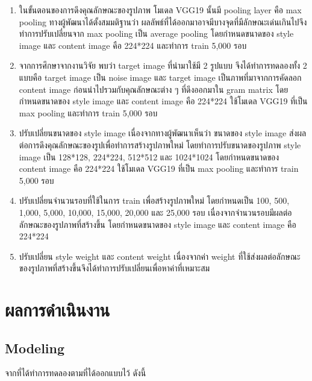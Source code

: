 \documentclass[12pt,oneside,openright,a4paper]{cpe-thai-project}
\begin{document}
\begin{enumerate}
  \item ในขั้นตอนของการดึงคุณลักษณะของรูปภาพ โมเดล VGG19 นั้นมี pooling layer คือ max pooling ทางผู้พัฒนาได้ตั้งสมมติฐานว่า ผลลัพธ์ที่ได้ออกมาอาจมีบางจุดที่มีลักษณะเด่นเกินไปจึงทำการปรับเปลี่ยนจาก max pooling เป็น average pooling โดยกำหนดขนาดของ style image และ content image คือ 224*224 และทำการ train 5,000 รอบ
  \item จากการศึกษาจากงานวิจัย พบว่า target image ที่นำมาใช้มี 2 รูปแบบ จึงได้ทำการทดลองทั้ง 2 แบบคือ target image เป็น noise image และ target image เป็นภาพที่มาจากการคัดลอก content image ก่อนนำไปรวมกับคุณลักษณะต่าง ๆ ที่ดึงออกมาใน gram matrix โดยกำหนดขนาดของ style image และ content image คือ 224*224 ใช้โมเดล VGG19 ที่เป็น max pooling และทำการ train 5,000 รอบ
  \item ปรับเปลี่ยนขนาดของ style image เนื่องจากทางผู้พัฒนาเห็นว่า ขนาดของ style image ส่งผลต่อการดึงคุณลักษณะของรูปเพื่อทำการสร้างรูปภาพใหม่ โดยทำการปรับขนาดของรูปภาพ style image เป็น 128*128, 224*224, 512*512 และ 1024*1024 โดยกำหนดขนาดของ content image คือ 224*224 ใช้โมเดล VGG19 ที่เป็น max pooling และทำการ train 5,000 รอบ
  \item ปรับเปลี่ยนจำนวนรอบที่ใช้ในการ train เพื่อสร้างรูปภาพใหม่ โดยกำหนดเป็น 100, 500, 1,000, 5,000, 10,000, 15,000, 20,000 และ 25,000 รอบ เนื่องจากจำนวนรอบมีผลต่อลักษณะของรูปภาพที่สร้างขึ้น โดยกำหนดขนาดของ style image และ content image คือ 224*224
  \item ปรับเปลี่ยน style weight และ content weight เนื่องจากค่า weight ที่ใช้ส่งผลต่อลักษณะของรูปภาพที่สร้างขึ้นจึงได้ทำการปรับเปลี่ยนเพื่อหาค่าที่เหมาะสม
\end{enumerate}










\chapter{ผลการดำเนินงาน}


\section{Modeling} 
จากที่ได้ทำการทดลองตามที่ได้ออกแบบไว้ ดังนี้
\end{document}
